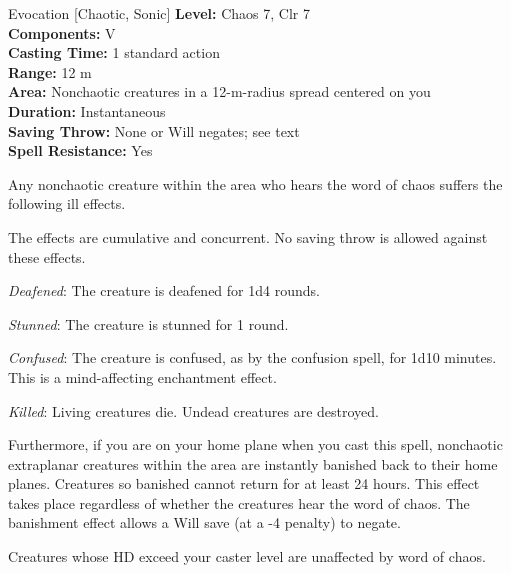 {Evocation [Chaotic, Sonic]}
{
	\textbf{Level:}
	Chaos 7, Clr 7\\
	\textbf{Components:}
	V\\
	\textbf{Casting Time:}
	1 standard action\\
	\textbf{Range:}
	12 m\\
	\textbf{Area:}
	Nonchaotic creatures in a 12-m-radius spread centered on you\\
	\textbf{Duration:}
	Instantaneous\\
	\textbf{Saving Throw:}
	None or Will negates; see text\\
	\textbf{Spell Resistance:}
	Yes\\
}
{
	Any nonchaotic creature within the area who hears the word of chaos suffers the following ill effects.

	The effects are cumulative and concurrent. No saving throw is allowed against these effects.


	\textit{Deafened}:
	The creature is deafened for 1d4 rounds.

	\textit{Stunned}:
	The creature is stunned for 1 round.

	\textit{Confused}:
	The creature is confused, as by the confusion spell, for 1d10 minutes. This is a mind-affecting enchantment effect.

	\textit{Killed}:
	Living creatures die. Undead creatures are destroyed.

	Furthermore, if you are on your home plane when you cast this spell, nonchaotic extraplanar creatures within the area are instantly banished back to their home planes. Creatures so banished cannot return for at least 24 hours. This effect takes place regardless of whether the creatures hear the word of chaos. The banishment effect allows a Will save (at a -4 penalty) to negate.

	Creatures whose HD exceed your caster level are unaffected by word of chaos.

}
